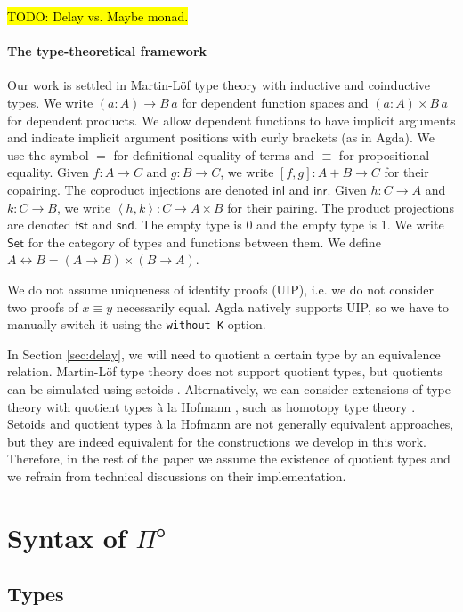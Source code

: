 \documentclass[runningheads]{llncs}
\newcommand{\Pio}{$\mathsf{\Pi}^{\mathsf{o}}$}
\newcommand{\Set}{\mathsf{Set}}
\newcommand{\U}{\mathcal{U}}
\newcommand{\copair}[2]{[#1,#2]}
\newcommand{\pair}[2]{\left< #1,#2 \right>}
\newcommand{\inl}{\mathsf{inl}}
\newcommand{\inr}{\mathsf{inr}}
\newcommand{\fst}{\mathsf{fst}}
\newcommand{\snd}{\mathsf{snd}}
\newcommand{\todo}[1]{\hl{TODO: #1}}
\begin{document}
\todo{Delay vs. Maybe monad.}

\paragraph{The type-theoretical framework}

Our work is settled in Martin-L\"of type theory with inductive and
coinductive types. We write $(a : A) \to B \,a$ for dependent function
spaces and $(a : A) \times B \,a$ for dependent products. We allow
dependent functions to have implicit arguments and indicate implicit
argument positions with curly brackets (as in Agda). We use the
symbol $=$ for definitional equality of terms and $\equiv$ for
propositional equality. Given $f : A \to C$ and
$g : B \to C$, we write $\copair f g : A + B \to C$ for their
copairing. The coproduct injections are denoted $\inl$ and $\inr$.
Given $h : C \to A$ and $k : C \to B$, we write
$\pair h k : C \to A \times B$ for their pairing. The product
projections are denoted $\fst$ and $\snd$. The empty type is 0 and the
empty type is 1. We write $\Set$ for the category of
types and functions between them.
We define $A \leftrightarrow B = (A \to B) \times (B \to A)$.

We do not assume uniqueness of identity proofs
(UIP), i.e. we do not consider two proofs of $x \equiv y$ necessarily
equal. Agda natively supports UIP, so we have to manually switch it
using the \verb|without-K| option.

In Section \ref{sec:delay}, we will need to quotient a certain type by
an equivalence relation. Martin-L\"of type theory does not support
quotient types, but quotients can be simulated using setoids
\cite{BartheCP03}. Alternatively, we can consider extensions of type theory with
quotient types \`a la Hofmann \cite{Hofmann}, such as homotopy type
theory \cite{Hott}. Setoids and quotient types \`a la
Hofmann are not generally equivalent approaches, but they are indeed
equivalent for the constructions we develop in this work. Therefore,
in the rest of the paper we assume the existence of quotient types and
we refrain from technical discussions on their implementation.


\section{Syntax of \Pio}\label{sec:syntax}

\subsection{Types}
\end{document}
